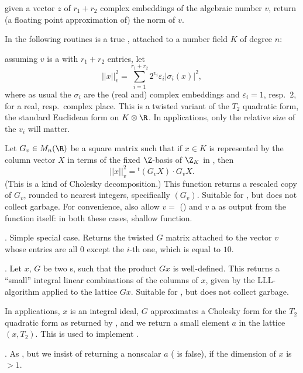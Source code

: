  given a vector $z$ of $r_1+r_2$ complex
embeddings of the algebraic number $v$, return (a floating point
approximation of) the norm of $v$.


In the following routines  is a true , attached to a number
field $K$ of degree $n$:

 assuming $v$ is a 
with $r_1+r_2$ entries, let
$$|| x ||_v^2 = \sum_{i=1}^{r_1+r_2} 2^{v_i}\varepsilon_i|\sigma_i(x)|^2,$$
where as usual the $\sigma_i$ are the (real and) complex embeddings and
$\varepsilon_i = 1$, resp.~$2$, for a real, resp.~complex place.
This is a twisted variant of the $T_2$ quadratic form, the standard Euclidean
form on $K\otimes \R$. In applications, only the relative size of the $v_i$
will matter.

Let $G_v\in M_n(\R)$ be a square matrix such that if $x\in K$ is represented by
the column vector $X$ in terms of the fixed $\Z$-basis of $\Z_K$ in ,
then
$$||x||_v^2 = {}^t (G_v X) \cdot G_v X.$$
(This is a kind of Cholesky decomposition.) This function
returns a rescaled copy of $G_v$, rounded to nearest integers, specifically
$(G_v)$.
Suitable for , but does not collect garbage. For
convenience, also allow $v = $ () and $v$
a  as output from the function itself: in both these cases,
shallow function.

. Simple special case. Returns the
twisted $G$ matrix attached to the vector $v$ whose entries are all $0$
except the $i$-th one, which is equal to $10$.

. Let $x$, $G$ be two s,
such that the product $Gx$ is well-defined. This returns a ``small'' integral
linear combinations of the columns of $x$, given by the LLL-algorithm applied
to the lattice $G x$. Suitable for , but does not collect
garbage.

In applications, $x$ is an integral ideal, $G$ approximates a Cholesky form for
the $T_2$ quadratic form as returned by , and we return
a small element $a$ in the lattice $(x,T_2)$. This is used to implement
.

. As ,
but we insist of returning a nonscalar $a$ ( is false), if
the dimension of $x$ is $> 1$.

